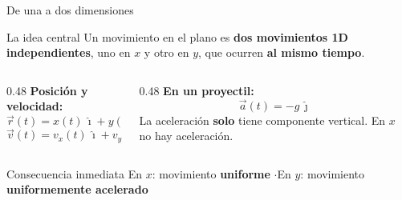 \documentclass[aspectratio=169,xcolor=dvipsnames]{beamer}
\begin{document}
	\begin{frame}{De una a dos dimensiones}
		\begin{block}{La idea central}
			\centering
			Un movimiento en el plano es \textbf{dos movimientos 1D independientes}, uno en $x$ y otro en $y$,
			que ocurren \textbf{al mismo tiempo}.
		\end{block}
		
		\vspace{0.3cm}
		\begin{columns}[T]
			\begin{column}{0.48\textwidth}
				\textbf{Posición y velocidad:}
				\[
				\vec{r}(t) = x(t)\,\hat{\imath} + y(t)\,\hat{\jmath}
				\]
				\[
				\vec{v}(t) = v_x(t)\,\hat{\imath} + v_y(t)\,\hat{\jmath}
				\]
			\end{column}
			\begin{column}{0.48\textwidth}
				\textbf{En un proyectil:}
				\[
				\vec{a}(t) = -g\,\hat{\jmath}
				\]
				\small La aceleración \textbf{solo} tiene componente vertical.
				En $x$ no hay aceleración.
			\end{column}
		\end{columns}
		
		\vspace{0.35cm}
		\begin{exampleblock}{Consecuencia inmediata}
			\centering
			En $x$: movimiento \textbf{uniforme} \qquad$\cdot$\qquad En $y$: movimiento \textbf{uniformemente acelerado}
		\end{exampleblock}
	\end{frame}
	
\end{document}
